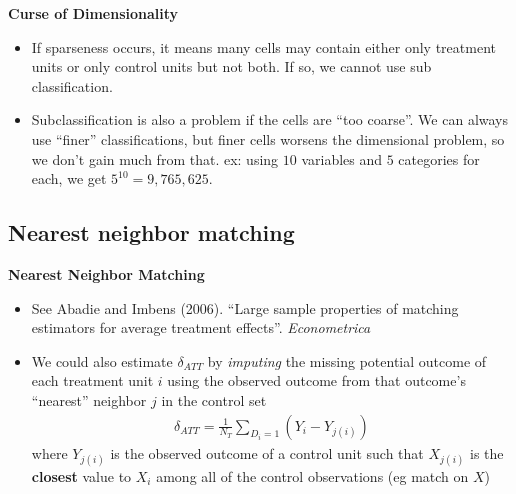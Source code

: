 \documentclass[notes=show]{beamer}
\begin{document}
\begin{frame}[plain]
	\begin{center}
	\textbf{Curse of Dimensionality}
	\end{center}
	
	\begin{itemize}
	\item If sparseness occurs, it means many cells may contain either only treatment units or only control units but not both.  If so, we cannot use sub classification.
	\item Subclassification is also a problem if the cells are ``too coarse''.  We can always use ``finer'' classifications, but finer cells worsens the dimensional problem, so we don't gain  much from that.  ex: using $10$ variables and $5$ categories for each, we get $5^{10} = 9,765,625$.  
	\end{itemize}
\end{frame}	


\subsection{Nearest neighbor matching}

\begin{frame}
	\begin{center}
	\textbf{Nearest Neighbor Matching}
	\end{center}
	
	\begin{itemize}
	\item See Abadie and Imbens (2006). ``Large sample properties of matching
        estimators for average treatment effects''.  \emph{Econometrica}
	\item We could also estimate $\delta_{ATT}$ by \emph{imputing} the missing potential outcome of each treatment unit $i$ using the observed outcome from that outcome's ``nearest'' neighbor $j$ in the control set
		\begin{eqnarray*}
		\delta_{ATT} = \frac{1}{N_T}\sum_{D_i=1} (Y_i - Y_{j(i)})
		\end{eqnarray*}where $Y_{j(i)}$ is the observed outcome of a control unit such that $X_{j(i)}$ is the \textbf{closest} value to $X_i$ among all of the control observations (eg match on $X$)
	\end{itemize}
\end{frame}
\end{document}
